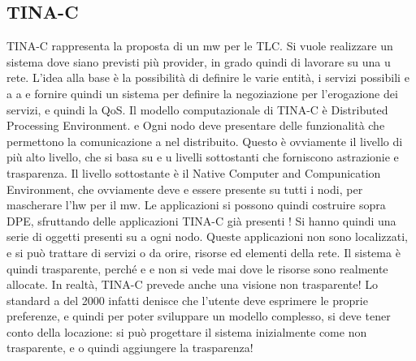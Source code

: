 \subsection{TINA-C}
TINA-C rappresenta la proposta di un mw per le TLC. Si vuole realizzare un
sistema dove siano previsti più provider, in grado quindi di lavorare su una
u
rete. L'idea alla base è la possibilità di definire le varie entità, i servizi possibili
e
a
a
e fornire quindi un sistema per definire la negoziazione per l'erogazione dei
servizi, e quindi la QoS.
Il modello computazionale di TINA-C è Distributed Processing Environment.
e
Ogni nodo deve presentare delle funzionalità che permettono la comunicazione
a
nel distribuito. Questo è ovviamente il livello di più alto livello, che si basa su
e
u
livelli sottostanti che forniscono astrazionie e trasparenza. Il livello sottostante
è il Native Computer and Compunication Environment, che ovviamente deve
e
essere presente su tutti i nodi, per mascherare l'hw per il mw.
Le applicazioni si possono quindi costruire sopra DPE, sfruttando delle applicazioni TINA-C già presenti ! Si hanno
quindi una serie di oggetti presenti su
a
ogni nodo. Queste applicazioni non sono localizzati, e si può trattare di servizi
o
da orire, risorse ed elementi della rete. Il sistema è quindi trasparente, perché
e
e
non si vede mai dove le risorse sono realmente allocate.
In realtà, TINA-C prevede anche una visione non trasparente! Lo standard
a
del 2000 infatti denisce che l'utente deve esprimere le proprie preferenze, e
quindi per poter sviluppare un modello complesso, si deve tener conto della
locazione: si può progettare il sistema inizialmente come non trasparente, e
o
quindi aggiungere la trasparenza!
